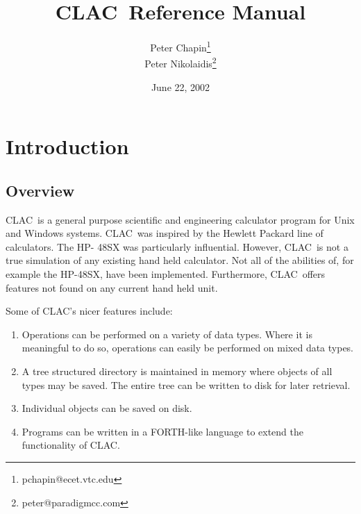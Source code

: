 \documentclass{report}
\newcommand{\CLAC}{CLAC}
\begin{document}
\title{\CLAC\ Reference Manual}
\author{Peter Chapin\thanks{pchapin@ecet.vtc.edu}\\
        Peter Nikolaidis\thanks{peter@paradigmcc.com}}
\date{June 22, 2002}
\maketitle

\tableofcontents
\newpage
{}

\chapter{Introduction}

\section{Overview}

\CLAC\ is a general purpose scientific and engineering calculator
program for Unix and Windows systems. \CLAC\ was inspired by the Hewlett
Packard line of calculators. The HP- 48SX was particularly influential.
However, \CLAC\ is not a true simulation of any existing hand held
calculator. Not all of the abilities of, for example the HP-48SX, have
been implemented. Furthermore, \CLAC\ offers features not found on any
current hand held unit.

Some of \CLAC's nicer features include:

\begin{enumerate}
  
\item Operations can be performed on a variety of data types. Where it
  is meaningful to do so, operations can easily be performed on mixed
  data types.
  
\item A tree structured directory is maintained in memory where objects
  of all types may be saved. The entire tree can be written to disk for
  later retrieval.

\item Individual objects can be saved on disk.
  
\item Programs can be written in a FORTH-like language to extend the
  functionality of \CLAC.

\end{enumerate}
\end{document}
